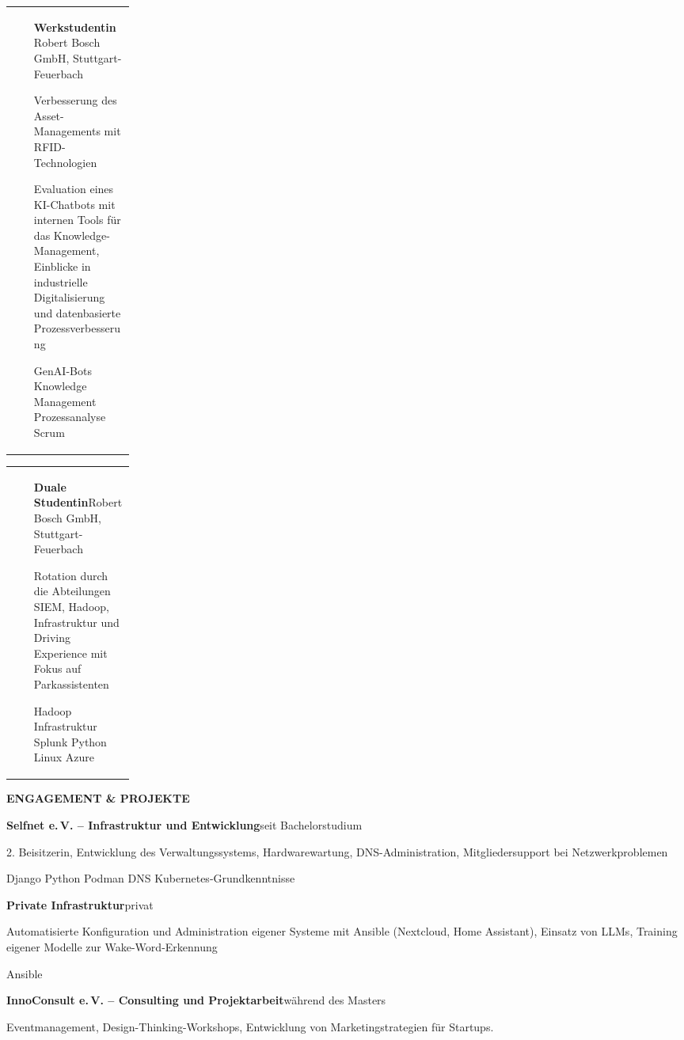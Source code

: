 \documentclass[10pt,a4paper]{article}
\makeatletter
\newcommand{\mainsection}[1]{%
  \vspace{2mm}%
  {\large\bfseries\textcolor{CVPrimary}{\MakeUppercase{#1}}}\par
  \vspace{0.8mm}{\color{CVAccent}\rule{\linewidth}{0.6pt}}\vspace{1.2mm}
}
\newcommand{\entry}[4]{%
  \begin{tabularx}{\linewidth}{@{}>{\raggedright\arraybackslash}p{0.18\linewidth}@{\hspace{2.5mm}}X@{}}
    {\small\textcolor{CVMuted}{#1}} &
    {\bfseries #2}\hfill{\small\textcolor{CVMuted}{#3}}\par
    #4
  \end{tabularx}\vspace{1.2mm}
}
\newcommand{\compactentry}[3]{%
  {\bfseries #1}\hfill{\small\textcolor{CVMuted}{#2}}\par
  #3\par\vspace{1.7mm}
}
\newcommand{\tag}[1]{%
  \begingroup
  \setlength{\fboxsep}{1.4pt}%
  \colorbox{CVSoft}{\scriptsize\textcolor{CVPrimary}{#1}}%
  \endgroup\hspace{0.7mm}%
}
\makeatother
\begin{document}
\begin{minipage}[t]{0.705\textwidth}
  \entry{10/2024--03/2025}{Werkstudentin}{Robert Bosch GmbH, Stuttgart-Feuerbach}{
    Verbesserung des Asset-Managements mit RFID-Technologien\par Evaluation eines
    KI-Chatbots mit internen Tools für das Knowledge-Management, Einblicke in
    industrielle Digitalisierung und datenbasierte Prozessverbesserung\par
    \tag{GenAI-Bots}\tag{Knowledge Management}\tag{Prozessanalyse}\tag{Scrum}
  }

  \entry{10/2021--09/2024}{Duale Studentin}{Robert Bosch GmbH, Stuttgart-Feuerbach}{
    Rotation durch die Abteilungen SIEM, Hadoop, Infrastruktur und Driving Experience mit Fokus auf
    Parkassistenten\par
    \tag{Hadoop}\tag{Infrastruktur}\tag{Splunk}\tag{Python}\tag{Linux}\tag{Azure}
  }

  \mainsection{Engagement \& Projekte}

  \compactentry{Selfnet e.\,V. -- Infrastruktur und Entwicklung}{seit Bachelorstudium}{
    2. Beisitzerin, Entwicklung des Verwaltungssystems, Hardwarewartung,
    DNS-Administration, Mitgliedersupport bei Netzwerkproblemen\par
    \tag{Django}\tag{Python}\tag{Podman}\tag{DNS}\tag{Kubernetes-Grundkenntnisse}
  }

  \compactentry{Private Infrastruktur}{privat}{
    Automatisierte Konfiguration und Administration eigener Systeme mit Ansible
    (Nextcloud, Home Assistant), Einsatz von LLMs, Training eigener
    Modelle zur Wake-Word-Erkennung\par
    \tag{Ansible}
  }

  \compactentry{InnoConsult e.\,V. -- Consulting und Projektarbeit}{während des Masters}{
    Eventmanagement, Design-Thinking-Workshops, Entwicklung von Marketingstrategien für Startups.
  }
\end{minipage}
\end{document}
